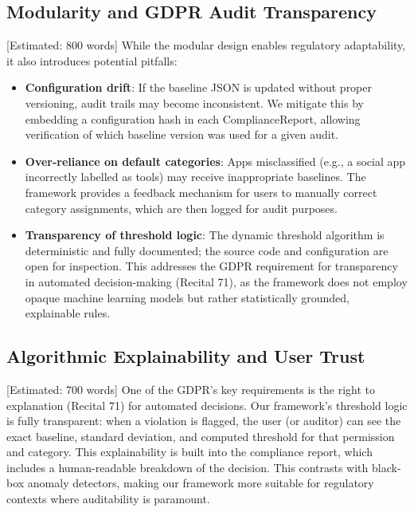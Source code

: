 \subsection{Modularity and GDPR Audit Transparency} [Estimated: 800 words]
While the modular design enables regulatory adaptability, it also introduces potential pitfalls:
\begin{itemize}
\item \textbf{Configuration drift}: If the baseline JSON is updated without proper versioning, audit trails may become inconsistent. We mitigate this by embedding a configuration hash in each ComplianceReport, allowing verification of which baseline version was used for a given audit.
\item \textbf{Over-reliance on default categories}: Apps misclassified (e.g., a social app incorrectly labelled as tools) may receive inappropriate baselines. The framework provides a feedback mechanism for users to manually correct category assignments, which are then logged for audit purposes.
\item \textbf{Transparency of threshold logic}: The dynamic threshold algorithm is deterministic and fully documented; the source code and configuration are open for inspection. This addresses the GDPR requirement for transparency in automated decision-making (Recital 71), as the framework does not employ opaque machine learning models but rather statistically grounded, explainable rules.
\end{itemize}

\subsection{Algorithmic Explainability and User Trust} [Estimated: 700 words]
One of the GDPR's key requirements is the right to explanation (Recital 71) for automated decisions. Our framework's threshold logic is fully transparent: when a violation is flagged, the user (or auditor) can see the exact baseline, standard deviation, and computed threshold for that permission and category. This explainability is built into the compliance report, which includes a human-readable breakdown of the decision. This contrasts with black-box anomaly detectors, making our framework more suitable for regulatory contexts where auditability is paramount.

